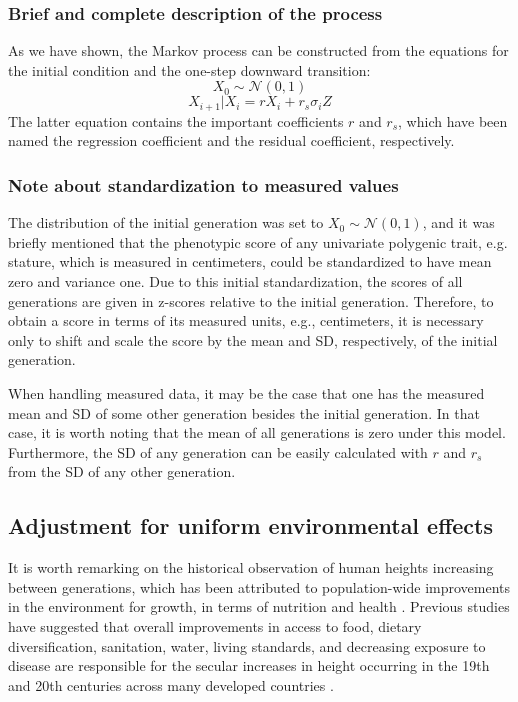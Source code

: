 \documentclass[a4paper,11pt]{article} %
\begin{document}
\subsubsection{Brief and complete description of the process}
As we have shown, the Markov process can be constructed from the equations for the initial condition and the one-step downward transition:
$$X_0 \sim \mathcal{N}(0, 1)$$
$$X_{i+1}|X_i = rX_i+ r_s\sigma_iZ$$
The latter equation contains the important coefficients $r$ and $r_s$, which have been named the regression coefficient and the residual coefficient, respectively. 

\subsubsection*{Note about standardization to measured values}
The distribution of the initial generation was set to $X_0 \sim \mathcal{N}(0, 1)$, and it was briefly mentioned that the phenotypic score of any univariate polygenic trait, e.g. stature, which is measured in centimeters, could be standardized to have mean zero and variance one. Due to this initial standardization, the scores of all generations are given in z-scores relative to the initial generation. Therefore, to obtain a score in terms of its measured units, e.g., centimeters, it is necessary only to shift and scale the score by the mean and SD, respectively, of the initial generation. 

When handling measured data, it may be the case that one has the measured mean and SD of some other generation besides the initial generation. In that case, it is worth noting that the mean of all generations is zero under this model. Furthermore, the SD of any generation can be easily calculated with $r$ and $r_s$ from the SD of any other generation.


\subsection*{Adjustment for uniform environmental effects}
It is worth remarking on the historical observation of human heights increasing between generations, which has been attributed to population-wide improvements in the environment for growth, in terms of nutrition and health \cite{bogin}. Previous studies have suggested that overall improvements in access to food, dietary diversification, sanitation, water, living standards, and decreasing exposure to disease are responsible for the secular increases in height occurring in the 19th and 20th centuries across many developed countries \cite{perkins}. 
\end{document}
